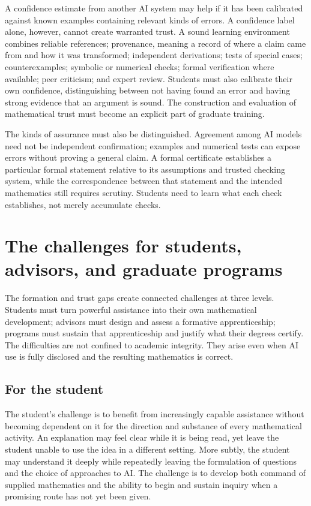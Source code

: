 \documentclass[11pt]{article}
\begin{document}
A confidence estimate from another AI system may help if it has been calibrated against
known examples containing relevant kinds of errors.  A confidence label alone, however,
cannot create warranted trust.  A sound learning environment combines reliable
references; provenance, meaning a record of where a claim came from and how it was
transformed; independent derivations; tests of special cases; counterexamples; symbolic
or numerical checks; formal verification where available; peer criticism; and expert
review.  Students must also calibrate their own confidence, distinguishing between not
having found an error and having strong evidence that an argument is sound.  The
construction and evaluation of mathematical trust must become an explicit part of
graduate training.

The kinds of assurance must also be distinguished. Agreement among AI models need not be
independent confirmation; examples and numerical tests can expose errors without proving
a general claim. A formal certificate establishes a particular formal statement relative
to its assumptions and trusted checking system, while the correspondence between that
statement and the intended mathematics still requires scrutiny. Students need to learn
what each check establishes, not merely accumulate checks.

\section{The challenges for students, advisors, and graduate programs}

The formation and trust gaps create connected challenges at three levels. Students must
turn powerful assistance into their own mathematical development; advisors must design
and assess a formative apprenticeship; programs must sustain that apprenticeship and
justify what their degrees certify. The difficulties are not confined to academic
integrity. They arise even when AI use is fully disclosed and the resulting mathematics
is correct.

\subsection{For the student}

The student's challenge is to benefit from increasingly capable assistance without
becoming dependent on it for the direction and substance of every mathematical activity.
An explanation may feel clear while it is being read, yet leave the student unable to
use the idea in a different setting. More subtly, the student may understand it deeply
while repeatedly leaving the formulation of questions and the choice of approaches to
AI. The challenge is to develop both command of supplied mathematics and the ability
to begin and sustain inquiry when a promising route has not yet been given.
\end{document}
